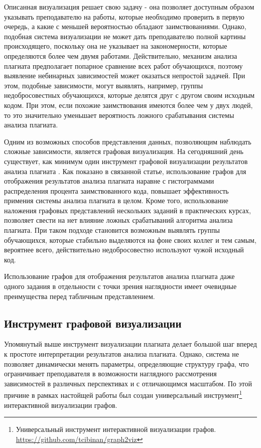 \documentclass{article}
\begin{document}
Описанная визуализация решает свою задачу - она позволяет доступным образом указывать преподавателю на работы, которые необходимо проверить в первую очередь, а какие с меньшей вероятностью обладают заимствованиями. Однако, подобная система визуализации не может дать преподавателю полной картины происходящего, поскольку она не указывает на закономерности, которые определяются более чем двумя работами. Действительно, механизм анализа плагиата предполагает попарное сравнение всех работ обучающихся, поэтому выявление небинарных зависимостей может оказаться непростой задачей. При этом, подобные зависимости, могут выявлять, например, группы недобросовестных обучающихся, которые делятся друг с другом своим исходным кодом. При этом, если похожие заимствования имеются более чем у двух людей, то это значительно уменьшает вероятность ложного срабатывания системы анализа плагиата.

Одним из возможных способов представления данных, позволяющим наблюдать сложные зависимости, является графовая визуализация. На сегодняшний день существует, как минимум один инструмент графовой визуализации результатов анализа плагиата \citep{plagiarismGraph}. Как показано в связанной статье, использование графов для отображения результатов анализа плагиата наравне с гистограммами распределения процента заимствованного кода, повышает эффективность примения системы анализа плагиата в целом. Кроме того, использование наложения графовых представлений нескольких заданий в практических курсах, позволяет свести на нет влияние ложных срабатываний алгоритма анализа плагиата. При таком подходе становится возможным выявлять группы обучающихся, которые стабильно выделяются на фоне своих коллег и тем самым, вероятнее всего, действительно недобросовестно используют чужой исходный код.

Использование графов для отображения результатов анализа плагиата даже одного задания в отдельности с точки зрения наглядности имеет очевидные преимущества перед табличным представлением.

\subsection{Инструмент графовой визуализации}

Упомянутый выше инструмент визуализации плагиата делает большой шаг вперед к простоте интерпретации результатов анализа плагиата. Однако, система не позволяет динамически менять параметры, определяющие структуру графа, что ограничивает преподавателя в возможности наглядного рассмотрения зависимостей в различных перспективах и с отличающимся масштабом. По этой причине в рамках настойщей работы был создан универсальный инструмент\footnote{Универсальный инструмент интерактивной визуализации графов. \url{https://github.com/tcibinan/graph2viz}} интерактивной визуализации графов.
\end{document}
